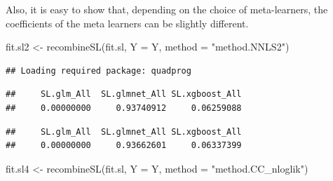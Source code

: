\documentclass[
]{book}
\newenvironment{Shaded}{\begin{snugshade}}{\end{snugshade}}
\newcommand{\AttributeTok}[1]{\textcolor[rgb]{0.77,0.63,0.00}{#1}}
\newcommand{\FunctionTok}[1]{\textcolor[rgb]{0.00,0.00,0.00}{#1}}
\newcommand{\NormalTok}[1]{#1}
\newcommand{\OtherTok}[1]{\textcolor[rgb]{0.56,0.35,0.01}{#1}}
\newcommand{\SpecialCharTok}[1]{\textcolor[rgb]{0.00,0.00,0.00}{#1}}
\newcommand{\StringTok}[1]{\textcolor[rgb]{0.31,0.60,0.02}{#1}}
\begin{document}
Also, it is easy to show that, depending on the choice of meta-learners, the coefficients of the meta learners can be slightly different.

\begin{Shaded}
\begin{Highlighting}[]
\NormalTok{fit.sl2 }\OtherTok{\textless{}{-}} \FunctionTok{recombineSL}\NormalTok{(fit.sl, }\AttributeTok{Y =}\NormalTok{ Y, }\AttributeTok{method =} \StringTok{"method.NNLS2"}\NormalTok{)}
\end{Highlighting}
\end{Shaded}

\begin{verbatim}
## Loading required package: quadprog
\end{verbatim}

\begin{Shaded}
\end{Shaded}

\begin{verbatim}
##     SL.glm_All  SL.glmnet_All SL.xgboost_All 
##     0.00000000     0.93740912     0.06259088
\end{verbatim}

\begin{Shaded}
\end{Shaded}

\begin{verbatim}
##     SL.glm_All  SL.glmnet_All SL.xgboost_All 
##     0.00000000     0.93662601     0.06337399
\end{verbatim}

\begin{Shaded}
\begin{Highlighting}[]
\NormalTok{fit.sl4 }\OtherTok{\textless{}{-}} \FunctionTok{recombineSL}\NormalTok{(fit.sl, }\AttributeTok{Y =}\NormalTok{ Y, }\AttributeTok{method =} \StringTok{"method.CC\_nloglik"}\NormalTok{)}
\end{Highlighting}
\end{Shaded}
\end{document}

